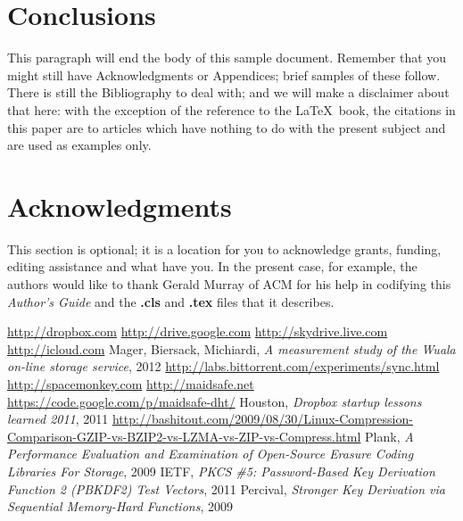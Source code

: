 \documentclass{acm_}
\begin{document}
\section{Conclusions}
This paragraph will end the body of this sample document.
Remember that you might still have Acknowledgments or
Appendices; brief samples of these
follow.  There is still the Bibliography to deal with; and
we will make a disclaimer about that here: with the exception
of the reference to the \LaTeX\ book, the citations in
this paper are to articles which have nothing to
do with the present subject and are used as
examples only.

\section{Acknowledgments}
This section is optional; it is a location for you
to acknowledge grants, funding, editing assistance and
what have you.  In the present case, for example, the
authors would like to thank Gerald Murray of ACM for
his help in codifying this \textit{Author's Guide}
and the \textbf{.cls} and \textbf{.tex} files that it describes.


\begin{thebibliography}{1}
 \url{http://dropbox.com}
 \url{http://drive.google.com}
 \url{http://skydrive.live.com}
 \url{http://icloud.com}
 Mager, Biersack, Michiardi, \emph{A measurement study of the {W}uala on-line storage service}, 2012
 \url{http://labs.bittorrent.com/experiments/sync.html}
 \url{http://spacemonkey.com}
 \url{http://maidsafe.net}
 \url{https://code.google.com/p/maidsafe-dht/}
 Houston, \emph{Dropbox startup lessons learned 2011}, 2011
 \url{http://bashitout.com/2009/08/30/Linux-Compression-Comparison-GZIP-vs-BZIP2-vs-LZMA-vs-ZIP-vs-Compress.html}
 Plank, \emph{A Performance Evaluation and Examination of Open-Source Erasure Coding Libraries For Storage}, 2009
 IETF, \emph{PKCS \#5: Password-Based Key Derivation Function 2 (PBKDF2) Test Vectors}, 2011
 Percival, \emph{Stronger Key Derivation via Sequential Memory-Hard Functions}, 2009
\end{thebibliography}

\balancecolumns
\end{document}
